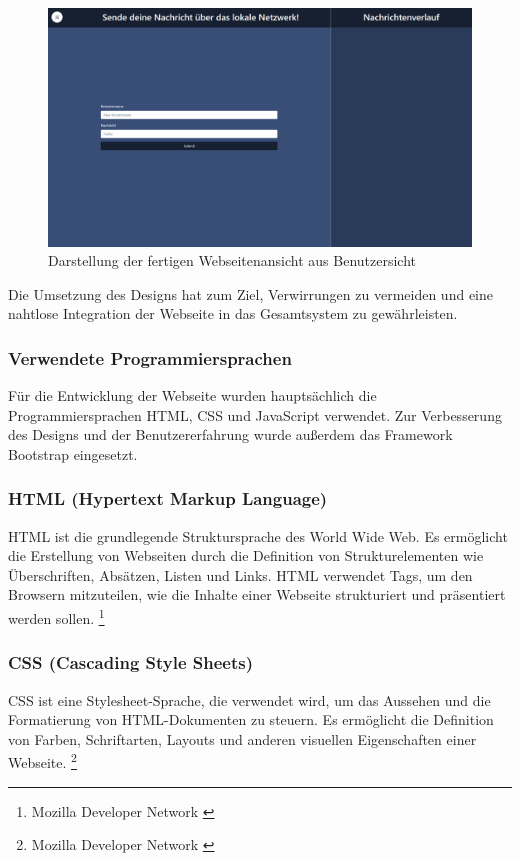 \begin{figure}[H]
    \centering
    \includegraphics[width=1\textwidth]{images/frontend.png}
    \caption{Darstellung der fertigen Webseitenansicht aus Benutzersicht}
    \label{fig:frontend}
\end{figure}

Die Umsetzung des Designs hat zum Ziel, Verwirrungen zu vermeiden und eine nahtlose Integration der Webseite in das
Gesamtsystem zu gewährleisten.

\subsubsection{Verwendete Programmiersprachen}
Für die Entwicklung der Webseite wurden hauptsächlich die Programmiersprachen HTML, CSS und JavaScript verwendet. Zur
Verbesserung des Designs und der Benutzererfahrung wurde außerdem das Framework Bootstrap eingesetzt.

\subsubsection*{HTML (Hypertext Markup Language)}
HTML ist die grundlegende Struktursprache des World Wide Web. Es ermöglicht die Erstellung von Webseiten durch die
Definition von Strukturelementen wie Überschriften, Absätzen, Listen und Links. HTML verwendet Tags, um den Browsern
mitzuteilen, wie die Inhalte einer Webseite strukturiert und präsentiert werden sollen. \footnote{Mozilla Developer Network \cite{HTML}}

\subsubsection*{CSS (Cascading Style Sheets)}
CSS ist eine Stylesheet-Sprache, die verwendet wird, um das Aussehen und die Formatierung von HTML-Dokumenten zu steuern.
Es ermöglicht die Definition von Farben, Schriftarten, Layouts und anderen visuellen Eigenschaften einer Webseite. \footnote{Mozilla Developer Network \cite{CSS}}

